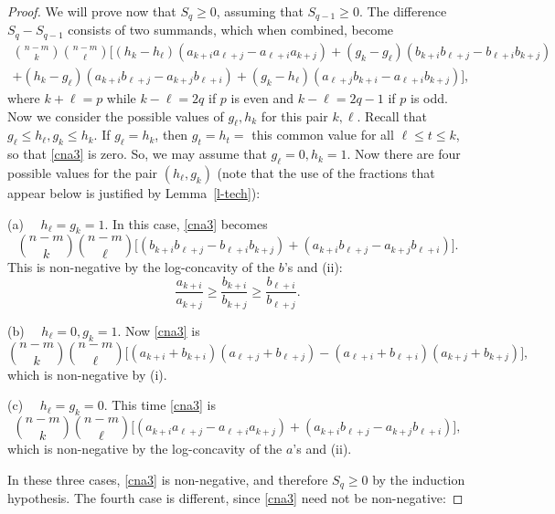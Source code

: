 \documentclass[10pt,reqno]{amsart}
\theoremstyle{plain}
\theoremstyle{definition}
\theoremstyle{remark}
\begin{document}
\begin{proof}
We will prove now that $S_q\geq 0$, assuming that $S_{q-1}\geq 0$.  
The difference $S_q-S_{q-1}$ consists
of two summands, which when combined, become
\begin{multline}\label{cna3}
\binom {n-m}k\binom {n-m}\ell\bigg[(h_k-h_\ell)(a_{k+i}a_{\ell+j}
-a_ {\ell+i}a_{k+j})+
(g_k-g_\ell)(b_{k+i}b_{\ell+j}-b_{\ell+i}b_{k+j})\\
+(h_k-g_\ell)(a_{k+i}b_{\ell+j}
-a_ {k+j}b_{\ell+i})+
(g_k-h_\ell)(a_{\ell+j}b_{k+i}-a_{\ell+i}b_{k+j})\bigg],
\end{multline}
where $k+\ell=p$ while $k-\ell=2q$ if $p$ is even and 
$k-\ell=2q-1$ if $p$ is odd.
Now we consider the possible values of $g_\ell,h_k$ for this pair $k,\ell$.  
Recall that
$g_\ell\leq h_\ell,g_k\leq h_k$. If $g_\ell=h_k$, then $g_t=h_t=$ this common  
value for all $\ell\leq t\leq k$,
so that \eqref{cna3} is zero. So, we may assume that $g_\ell=0,h_k=1$. 
Now there  are four
possible values for the pair $(h_\ell,g_k)$ (note that the use of the 
fractions that appear below is justified by Lemma~\ref{l-tech}):

\medskip

(a) $\quad h_\ell=g_k=1$. In this case, \eqref{cna3} becomes
$$\binom {n-m}k\binom
{n-m}\ell\bigg[(b_{k+i}b_{\ell+j}-b_{\ell+i}b_{k+j})
+(a_{k+i}b_{\ell+j}-a_{k+j}b_ {\ell+i})\bigg].$$
This is non-negative by the log-concavity of the $b$'s and (ii):
$$\frac{a_{k+i}}{a_{k+j}}\geq\frac{b_{k+i}}{b_{k+j}}\geq
\frac{b_{\ell+i}} {b_{\ell+j}}.$$

\medskip

(b) $\quad h_\ell=0,g_k=1$. Now \eqref{cna3} is
$$\binom {n-m}k\binom {n-m}\ell\bigg[(a_{k+i}+b_{k+i})(a_{\ell+j}+b_{\ell+j})
- (a_{\ell+i}+b_{\ell+i})(a_{k+j}+b_{k+j})
\bigg],$$
which is non-negative by (i).

\medskip

(c) $\quad h_\ell=g_k=0$. This time \eqref{cna3} is
$$\binom {n-m}k\binom {n-m}\ell\bigg[(a_{k+i}a_{\ell+j}-a_{\ell+i}a_{k+j})+
(a_{k+i}b_{\ell+j}-a_{k+j}b_{\ell+i})\bigg],$$
which is non-negative by the log-concavity of the $a$'s and (ii).

In these three cases, \eqref{cna3} is non-negative, and therefore 
$S_q \geq 0$ by the induction
hypothesis. The fourth case is different, since \eqref{cna3} need not be  
non-negative:

\medskip


\end{proof}
\end{document}
